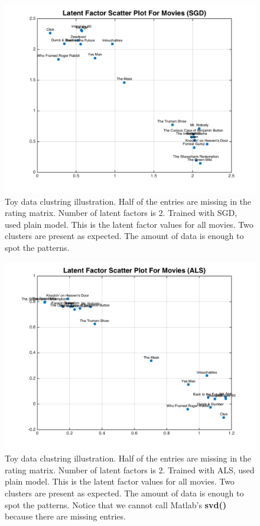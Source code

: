 \documentclass[11pt]{article}
\begin{document}
	\begin{figure}[H]
		\centering		
		\includegraphics[width=\columnwidth]{buff2/1}
		\caption{Toy data clustring illustration. Half of the entries are missing in the rating matrix. Number of latent factors is 2. Trained with SGD, used plain model. This is the latent factor values for all movies. Two clusters are present as expected. The amount of data is enough to spot the patterns.}
		\label{5}		
	\end{figure}
	\begin{figure}[H]
		\centering		
		\includegraphics[width=\wiq]{buff2/2}
		\caption{Toy data clustring illustration. Half of the entries are missing in the rating matrix. Number of latent factors is 2. Trained with ALS, used plain model. This is the latent factor values for all movies. Two clusters are present as expected. The amount of data is enough to spot the patterns. Notice that we cannot call Matlab's \textbf{svd()} because there are missing entries.}
		\label{5}		
	\end{figure}
\end{document}
